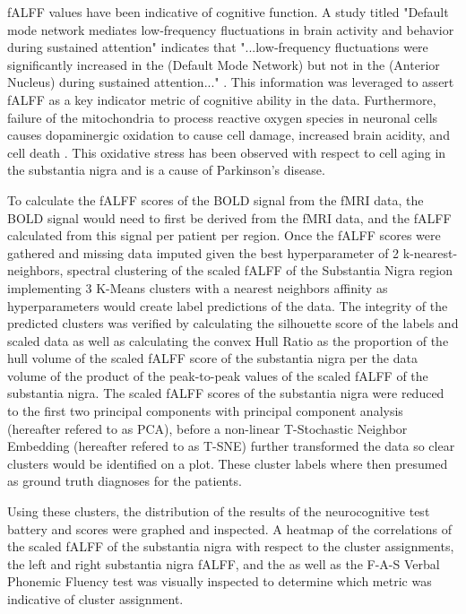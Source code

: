\documentclass[12pt]{article}
\begin{document}
fALFF values have been indicative of cognitive function. A study titled "Default mode network mediates low‐frequency fluctuations in brain activity and behavior during sustained attention" indicates that "...low‐frequency fluctuations were significantly increased in the (Default Mode Network) but not in the (Anterior Nucleus) during sustained attention..." \cite{35903957}. This information was leveraged to assert fALFF as a key indicator metric of cognitive ability in the data. Furthermore, failure of the mitochondria to process reactive oxygen species in neuronal cells causes dopaminergic oxidation to cause cell damage, increased brain acidity, and cell death \cite{https://doi.org/10.1111/acel.13031}. This oxidative stress has been observed with respect to cell aging in the substantia nigra and is a cause of Parkinson's disease.

To calculate the fALFF scores of the BOLD signal from the fMRI data, the BOLD signal would need to first be derived from the fMRI data, and the fALFF calculated from this signal per patient per region. Once the fALFF scores were gathered and missing data imputed given the best hyperparameter of 2 k-nearest-neighbors, spectral clustering of the scaled fALFF of the Substantia Nigra region implementing 3 K-Means clusters with a nearest neighbors affinity as hyperparameters would create label predictions of the data. The integrity of the predicted clusters was verified by calculating the silhouette score of the labels and scaled data as well as calculating the convex Hull Ratio as the proportion of the hull volume of the scaled fALFF score of the substantia nigra per the data volume of the product of the peak-to-peak values of the scaled fALFF of the substantia nigra. The scaled fALFF scores of the substantia nigra were reduced to the first two principal components with principal component analysis (hereafter refered to as PCA), before a non-linear T-Stochastic Neighbor Embedding (hereafter refered to as T-SNE) further transformed the data so clear clusters would be identified on a plot. These cluster labels where then presumed as ground truth diagnoses for the patients. 

Using these clusters, the distribution of the results of the neurocognitive test battery and scores were graphed and inspected. A heatmap of the correlations of the scaled fALFF of the substantia nigra with respect to the cluster assignments, the left and right substantia nigra fALFF, and the as well as the F-A-S Verbal Phonemic Fluency test was visually inspected to determine which metric was indicative of cluster assignment. 
\end{document}
